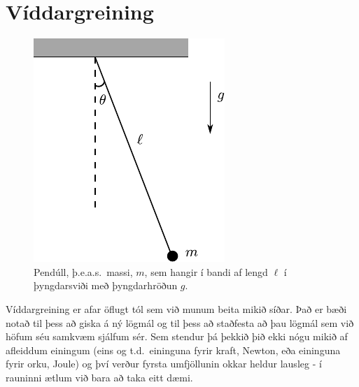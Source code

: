 \ifdefined \wholebook \else\documentclass[oneside]{book}\usepackage{EdlBook}\graphicspath{{figures/}}
\begin{document}
\section{Víddargreining}


\begin{minipage}{\linewidth}
    

\begin{figure}
\vspace{-1cm}
\centering
\includegraphics{kaflar/kafli01/figures/pendull.pdf}
\caption{Pendúll, þ.e.a.s.~massi, $m$, sem hangir í bandi af lengd $\ell$ í þyngdarsviði með þyngdarhröðun $g$.}
\label{fig:pendull}
\end{figure}

Víddargreining er afar öflugt tól sem við munum beita mikið síðar. Það er bæði notað til þess að giska á ný lögmál og til þess að staðfesta að þau lögmál sem við höfum séu samkvæm sjálfum sér. Sem stendur þá þekkið þið ekki nógu mikið af afleiddum einingum (eins og t.d.~eininguna fyrir kraft, Newton, eða eininguna fyrir orku, Joule) og því verður fyrsta umfjöllunin okkar heldur lausleg - í rauninni ætlum við bara að taka eitt dæmi.

\vspace{0.2cm}


\end{minipage}
\end{document}
